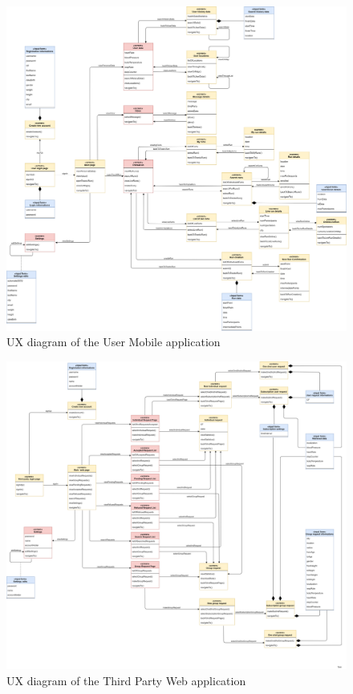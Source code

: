 \begin{figure}[H]

    \centering
    \includegraphics[width=1\textwidth]{./Pictures/UXMobile.png}
    \caption{UX diagram of the User Mobile application}
    
\end{figure}

\begin{figure}[H]

    \centering
    \includegraphics[width=1\textwidth]{./Pictures/UXWeb.png}
    \caption{UX diagram of the Third Party Web application}
    
\end{figure}

